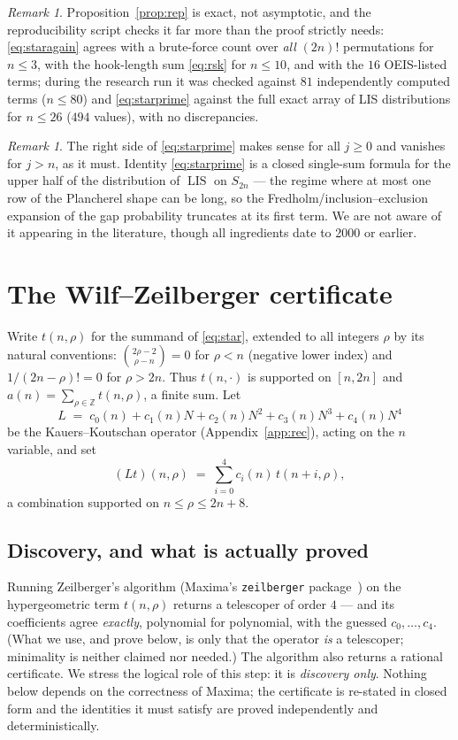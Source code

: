 \documentclass[11pt]{article}
\theoremstyle{plain}
\theoremstyle{definition}
\theoremstyle{remark}
\newtheorem{remark}[theorem]{Remark}
\newcommand{\LIS}{\operatorname{LIS}}
\newcommand{\Lop}{L}
\newcommand{\ZZ}{\mathbb{Z}}
\begin{document}
\begin{remark}\label{rem:checks}
Proposition~\ref{prop:rep} is exact, not asymptotic, and the reproducibility script checks it far
more than the proof strictly needs: \eqref{eq:staragain} agrees with a brute-force count over \emph{all}
$(2n)!$ permutations for $n\le3$, with the hook-length sum \eqref{eq:rsk} for $n\le10$, and with
the $16$ OEIS-listed terms; during the research run it was checked against $81$ independently
computed terms ($n\le80$) and \eqref{eq:starprime} against the full exact array of LIS
distributions for $n\le26$ ($494$ values), with no discrepancies.
\end{remark}

\begin{remark}
The right side of \eqref{eq:starprime} makes sense for all $j\ge0$ and vanishes for $j>n$, as it
must. Identity \eqref{eq:starprime} is a closed single-sum formula for the upper half of the
distribution of $\LIS$ on $S_{2n}$ --- the regime where at most one row of the Plancherel shape
can be long, so the Fredholm/inclusion--exclusion expansion of the gap probability truncates at
its first term. We are not aware of it appearing in the literature, though all ingredients date
to 2000 or earlier.
\end{remark}

\section{The Wilf--Zeilberger certificate}\label{sec:wz}

Write $t(n,\rho)$ for the summand of \eqref{eq:star}, extended to all integers $\rho$ by its
natural conventions: $\binom{2\rho-2}{\rho-n}=0$ for $\rho<n$ (negative lower index) and
$1/(2n-\rho)!=0$ for $\rho>2n$. Thus $t(n,\cdot)$ is supported on $[n,2n]$ and
$a(n)=\sum_{\rho\in\ZZ}t(n,\rho)$, a finite sum. Let
\[
  \Lop\;=\;c_0(n)+c_1(n)N+c_2(n)N^2+c_3(n)N^3+c_4(n)N^4
\]
be the Kauers--Koutschan operator (Appendix~\ref{app:rec}), acting on the $n$ variable, and set
\[
  (\Lop t)(n,\rho)\;=\;\sum_{i=0}^{4}c_i(n)\,t(n{+}i,\rho),
\]
a combination supported on $n\le\rho\le2n+8$.

\subsection{Discovery, and what is actually proved}

Running Zeilberger's algorithm (Maxima's \texttt{zeilberger} package~\cite{Maxima}) on the
hypergeometric term $t(n,\rho)$ returns a telescoper of order $4$ --- and its
coefficients agree \emph{exactly}, polynomial for polynomial, with the guessed
$c_0,\dots,c_4$. (What we use, and prove below, is only that the operator \emph{is} a
telescoper; minimality is neither claimed nor needed.) The algorithm also returns a rational
certificate. We stress the logical role of this step: it is \emph{discovery only}. Nothing below
depends on the correctness of Maxima; the certificate is re-stated in closed form and the
identities it must satisfy are proved independently and deterministically.
\end{document}
